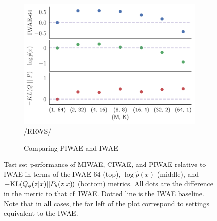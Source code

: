 \begin{figure}[t!]
\begin{subfigure}[b]{0.33\textwidth}
		\includegraphics[width=\textwidth]{figures/tighter_bounds/combinations_piwae}\figures/RRWS/
		\caption{Comparing \gls{PIWAE} and \gls{IWAE} \label{fig:mnistexpt/dotplot/piwae}}
	\end{subfigure} \vspace{-12pt}
	\caption{Test set performance of \gls{MIWAE}, \gls{CIWAE}, and \gls{PIWAE} relative to \gls{IWAE} in terms of the \gls{IWAE}-64 (top), $\log \hat p(x)$ (middle), and $-\mathrm{KL}(Q_{\phi}(z \lvert x) || P_{\theta}(z \lvert x))$ (bottom) metrics.  All dots are the difference in the metric to that of~\gls{IWAE}. Dotted line is the \gls{IWAE} baseline.
		Note that in all cases, the far left of the plot correspond to
		settings equivalent to the \gls{IWAE}.\vspace{-8pt} 	 \label{fig:mnistexpt/dotplot}}
\end{figure}


